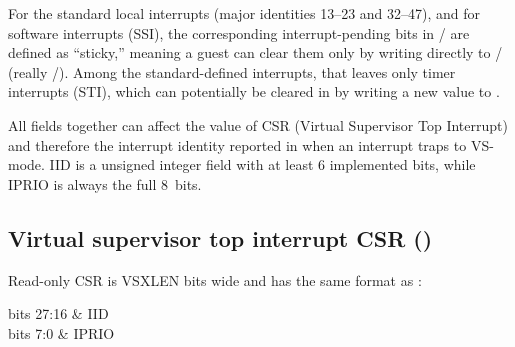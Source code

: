 \begin{commentary}
For the standard local interrupts
(major identities 13--23 and 32--47), and for
software interrupts (SSI), the corresponding interrupt-pending
bits in / are defined as ``sticky,''
meaning a guest can clear them only by writing directly
to / (really /).
Among the standard-defined interrupts, that leaves only
timer interrupts (STI), which can potentially be cleared
in  by writing a new value to .
\end{commentary}

All  fields together can affect
the value of CSR  (Virtual Supervisor Top Interrupt) and
therefore the interrupt identity reported in  when an
interrupt traps to \mbox{VS-mode}.
IID is a {\WARL} unsigned integer field with at least 6 implemented
bits, while IPRIO is always the full 8~bits.

\subsection{Virtual supervisor top interrupt CSR ()}

Read-only CSR  is VSXLEN bits wide and has the same format as
:\nopagebreak
\begin{displayLinesTable}[l@{\quad}l]
bits 27:16 & IID \\
bits 7:0   & IPRIO \\
\end{displayLinesTable}

